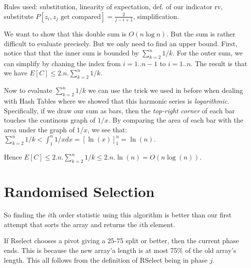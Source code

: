 Rules used: substitution, linearity of expectation, def. of our indicator rv, substitute 
$P[z_i, z_j \text{ get compared}]  = \frac{2}{j-i+1}$, simplification. 

We want to show that this double sum is $O(n\log n)$. But the sum is rather 
difficult to evaluate precisely. But we only need to find an upper bound.
First, notice that that the inner sum is bounded by $\sum^{n}_{k=2} {1/k}$. 
For the outer sum, we can simplify by chaning the index from $i=1..n-1$ to $i=1..n$. 
The result is that we have $E[C] \leqslant 2.n.\sum^{n}_{k=2} {1/k}$. 

\frmrule 

Now to evaluate $\sum^{n}_{k=2} {1/k}$ we can use the trick we used in before when 
dealing with Hash Tables where we showed that this harmonic series is \textit{logarithmic}. 
Specifically, if we draw our sum as bars, then the \textit{top-right corner} of each bar touches 
the continous graph of $1/x$. By comparing the area of 
each bar with the area under the graph of $1/x$, we 
see that: $\sum^{n}_{k=2} {1/k} < \int^{n}_{1} 1/x dx = [\ln(x)]^{n}_1 = \ln(n)$.

Hence $E[C] \leqslant 2.n.\sum^{n}_{k=2} {1/k} \leqslant 2.n.\ln(n) = O(n \log(n))$. 

\frmrule 


\section{Randomised Selection}




So finding the $i$th order statistic using this algorithm is better than 
our first attempt that sorts the array and returns the $i$th element.







If Rselect chooses a pivot giving a 25-75 split or better, 
then the current phase ends. This is because 
the new array'a length is at most 75\% of the old array's length. 
This all follows from the definition of RSelect being in phase $j$. 

